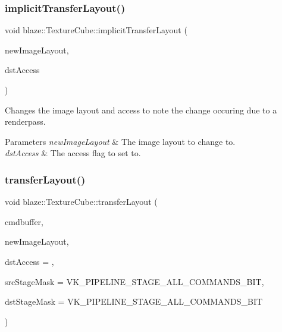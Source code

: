 \subsubsection{\texorpdfstring{implicit\+Transfer\+Layout()}{implicitTransferLayout()}}
{\footnotesize\ttfamily void blaze\+::\+Texture\+Cube\+::implicit\+Transfer\+Layout (\begin{DoxyParamCaption}\item[{Vk\+Image\+Layout}]{new\+Image\+Layout,  }\item[{Vk\+Access\+Flags}]{dst\+Access }\end{DoxyParamCaption})}



Changes the image layout and access to note the change occuring due to a renderpass. 


\begin{DoxyParams}{Parameters}
{\em new\+Image\+Layout} & The image layout to change to. \\
\hline
{\em dst\+Access} & The access flag to set to. \\
\hline
\end{DoxyParams}
\mbox{\label{classblaze_1_1TextureCube_aafdee6f11a7272e2ff8ccd8514177500}} 
\subsubsection{\texorpdfstring{transfer\+Layout()}{transferLayout()}}
{\footnotesize\ttfamily void blaze\+::\+Texture\+Cube\+::transfer\+Layout (\begin{DoxyParamCaption}\item[{Vk\+Command\+Buffer}]{cmdbuffer,  }\item[{Vk\+Image\+Layout}]{new\+Image\+Layout,  }\item[{Vk\+Access\+Flags}]{dst\+Access = {},  }\item[{Vk\+Pipeline\+Stage\+Flags}]{src\+Stage\+Mask = {\ttfamily VK\+\_\+PIPELINE\+\_\+STAGE\+\_\+ALL\+\_\+COMMANDS\+\_\+BIT},  }\item[{Vk\+Pipeline\+Stage\+Flags}]{dst\+Stage\+Mask = {\ttfamily VK\+\_\+PIPELINE\+\_\+STAGE\+\_\+ALL\+\_\+COMMANDS\+\_\+BIT} }\end{DoxyParamCaption})}




